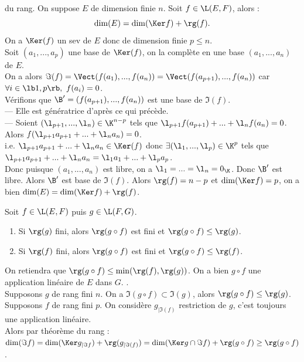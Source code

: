 \documentclass[11pt]{article}
\begin{document}
\begin{thm}{du rang.}{}
    On suppose $E$ de dimension finie $n$. Soit $f\in\L(E,F)$, alors :
    \begin{equation*}
        \dim(E)=\dim(\Ker f)+\rg(f).
    \end{equation*}
    \tcblower
    On a $\Ker(f)$ un sev de $E$ donc de dimension finie $p\leq n$.\\
    Soit $(a_1,...,a_p)$ une base de $\Ker(f)$, on la complète en une base $(a_1,...,a_n)$ de $E$.\\
    On a alors $\Im(f)=\Vect(f(a_1),...,f(a_n))=\Vect(f(a_{p+1}),...,f(a_n))$ car $\forall i \in \lb1,p\rb, ~ f(a_i)=0$.\\
    Vérifions que $\B'=(f(a_{p+1}),...,f(a_n))$ est une base de $\Im(f)$.\\
    --- Elle est génératrice d'après ce qui précède.\\
    --- Soient $(\l_{p+1},...,\l_n)\in\K^{n-p}$ tels que $\l_{p+1}f(a_{p+1})+...+\l_nf(a_n)=0$. Alors $f(\l_{p+1}a_{p+1}+...+\l_na_n)=0$.\\
    i.e. $\l_{p+1}a_{p+1}+...+\l_na_n\in\Ker(f)$ donc $\exists(\l_1,...,\l_p)\in\K^p$ tels que $\l_{p+1}a_{p+1}+...+\l_na_n=\l_1a_1+...+\l_pa_p$.\\
    Donc puisque $(a_1,...,a_n)$ est libre, on a $\l_1=...=\l_n=0_\K$. Donc $\B'$ est libre.\n
    Alors $\B'$ est base de $\Im(f)$. Alors $\rg(f)=n-p$ et $\dim(\Ker f)=p$, on a bien $\dim(E)=\dim(\Ker f)+\rg(f)$.
\end{thm}

\begin{prop}{}{}
    Soit $f\in\L(E,F)$ puis $g\in\L(F,G)$.
    \begin{enumerate}
        \item Si $\rg(g)$ fini, alors $\rg(g\circ f)$ est fini et $\rg(g\circ f)\leq\rg(g)$.
        \item Si $\rg(f)$ fini, alors $\rg(g\circ f)$ est fini et $\rg(g\circ f)\leq\rg(f)$.
    \end{enumerate}
    On retiendra que $\rg(g\circ f)\leq\min(\rg(f),\rg(g))$.
    \tcblower
    On a bien $g\circ f$ une application linéaire de $E$ dans $G$. .\\
     Supposons $g$ de rang fini $n$. On a $\Im(g\circ f)\subset\Im(g)$, alors $\rg(g\circ f)\leq \rg(g)$.\\
     Supposons $f$ de rang fini $p$. On considère $g_{|\Im(f)}$ restriction de $g$, c'est toujours une application linéaire.\\
    Alors par théorème du rang : $\dim(\Im f) = \dim(\Ker g_{|\Im f}) + \rg(g_{|\Im(f)})=\dim(\Ker g \cap \Im f)+\rg(g\circ f)\geq\rg(g\circ f)$.
\end{prop}
\end{document}

